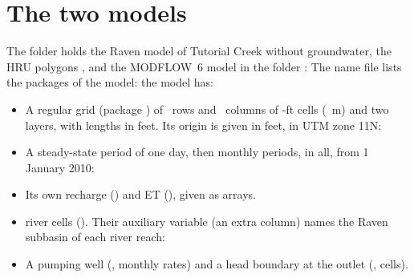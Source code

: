 \section{The two models}

The folder holds the Raven model of Tutorial Creek without groundwater, the HRU polygons , and the
MODFLOW~6 model in the folder :
The name file lists the packages of the model:
\why the model has:
\begin{itemize}
\item A regular grid (package ) of ~rows and ~columns of -ft cells
  (~m) and two layers, with lengths in feet. Its origin is given in feet, in UTM zone 11N:
\item A steady-state period of one day, then monthly periods,  in all, from 1 January 2010:
\item Its own recharge () and ET (), given as arrays.
\item {} river cells (). Their auxiliary variable  (an extra column) names the Raven
  subbasin of each river reach:
\item A pumping well (, monthly rates) and a head boundary at the outlet (, 
  cells).
\end{itemize}
